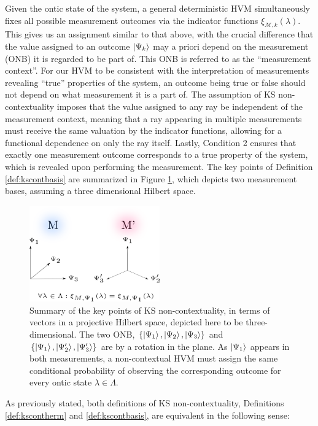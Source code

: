 Given the ontic state of the system, a general deterministic HVM simultaneously fixes all possible measurement outcomes via the indicator functions $\xi_{\mathcal{M},k}(\lambda)$. This gives us an assignment similar to that above, with the crucial difference that the value assigned to an outcome $\ket{\Psi_{k}}$  may a priori depend on the measurement (ONB) it is regarded to be part of. This ONB is referred to as the ``measurement context”. For our HVM to be consistent with the interpretation of measurements revealing ``true” properties of the system, an outcome being true or false should not depend on what measurement it is a part of. The assumption of KS non-contextuality imposes that the value assigned to any ray be independent of the measurement context, meaning that a ray appearing in multiple measurements must receive the same valuation by the indicator functions, allowing for a functional dependence on only the ray itself. Lastly, Condition 2 ensures that exactly one measurement outcome corresponds to a true property of the system, which is revealed upon performing the measurement. The key points of Definition \ref{def:kscontbasis} are summarized in Figure \ref{fig:onb}, which depicts two measurement bases, assuming a three dimensional Hilbert space.

\begin{figure}
    \centering
    \includegraphics[width=0.5\textwidth]{images/onb.png}
    \caption{Summary of the key points of KS non-contextuality, in terms of vectors in a projective Hilbert space, depicted here to be three-dimensional. The two ONB, $\{\ket{\Psi_1}, \ket{\Psi_2}, \ket{\Psi_3}\}$ and $\{\ket{\Psi_1}, \ket{\Psi_2'}, \ket{\Psi_3'}\}$ are by a rotation in the plane. As $\ket{\Psi_1}$ appears in both measurements, a non-contextual HVM must assign the same conditional probability of observing the corresponding outcome for every ontic state $\lambda\in\Lambda$.}
    \label{fig:onb}
\end{figure}

As previously stated, both definitions of KS non-contextuality, Definitions \ref{def:kscontherm} and \ref{def:kscontbasis}, are equivalent in the following sense:

